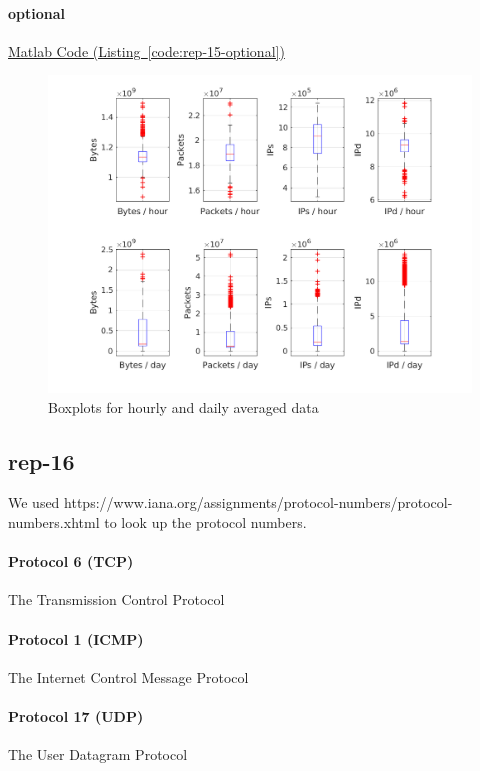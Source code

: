 \documentclass{article}
\newcommand{\codelink}[1]{%
    \hyperref[#1]{Matlab Code (Listing~\ref{#1})}%
}
\begin{document}

\paragraph{optional}

\codelink{code:rep-15-optional}

\begin{figure}[h]
    \centering
    \includegraphics[width=\textwidth]{../exercise-3/plots/rep_15_optional}
    \caption{\label{figure:rep-15-optional} Boxplots for hourly and daily averaged data}
\end{figure}

\subsection{rep-16}

We used https://www.iana.org/assignments/protocol-numbers/protocol-numbers.xhtml to look up the
protocol numbers.

\paragraph{Protocol 6 (TCP)}
The Transmission Control Protocol
\paragraph{Protocol 1 (ICMP)}
The Internet Control Message Protocol
\paragraph{Protocol 17 (UDP)}
The User Datagram Protocol
\end{document}
